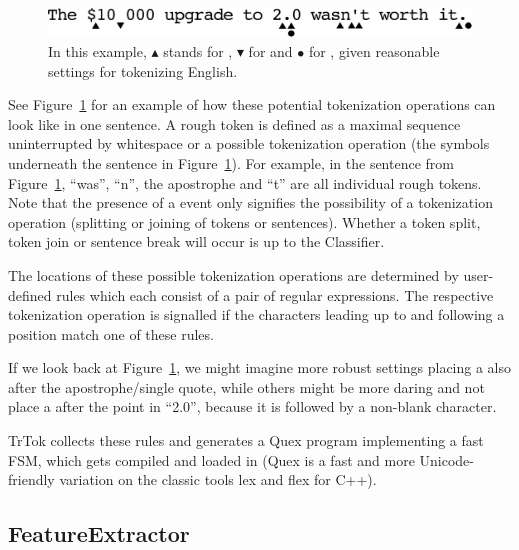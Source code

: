 \begin{figure}
  \begin{center}
    \includegraphics[width=\textwidth / 2]{img/decisionpoints.eps}
    \caption{In this example, $\blacktriangle$ stands for \maysplit{},
      $\blacktriangledown$ for \mayjoin{} and $\bullet$ for
      \maybreaksentence{}, given reasonable settings for tokenizing
      English.}
    \label{fig:decision-points}
  \end{center}
\end{figure}

See Figure~\ref{fig:decision-points} for an example of how these
potential tokenization operations can look like in one sentence. A
rough token is defined as a maximal sequence uninterrupted by
whitespace or a possible tokenization operation (the symbols
underneath the sentence in Figure~\ref{fig:decision-points}). For
example, in the sentence from Figure~\ref{fig:decision-points},
``was'', ``n'', the apostrophe and ``t'' are all individual rough
tokens. Note that the presence of a \may{} event only signifies the
possibility of a tokenization operation (splitting or joining of
tokens or sentences). Whether a token split, token join or sentence
break will occur is up to the Classifier.

The locations of these possible tokenization operations are determined
by user-defined rules which each consist of a pair of regular
expressions. The respective tokenization operation is signalled if the
characters leading up to and following a position match one of these
rules.

If we look back at Figure~\ref{fig:decision-points}, we might imagine
more robust settings placing a \maybreaksentence{} also after the
apostrophe/single quote, while others might be more daring and not
place a \maybreaksentence{} after the point in ``2.0'', because it is
followed by a non-blank character.

TrTok collects these rules and generates a Quex program implementing a
fast FSM, which gets compiled and loaded in (Quex is a fast and more
Unicode-friendly variation on the classic tools lex and flex for C++).

\subsection{FeatureExtractor}

